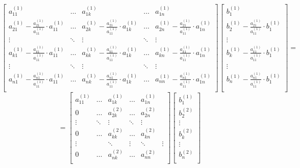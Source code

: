 \documentclass{article}
\begin{document}
\begin{center}
    $$
    \begin{bmatrix}
        a^{(1)}_{11} & \dots & a^{(1)}_{1k} & \dots & a^{(1)}_{1n} \\
        a^{(1)}_{21} -\frac{a^{(1)}_{21}}{a^{(1)}_{11}} \cdot a^{(1)}_{11} & \dots & a^{(1)}_{2k} -\frac{a^{(1)}_{21}}{a^{(1)}_{11}} \cdot a^{(1)}_{1k} & \dots & a^{(1)}_{2n} -\frac{a^{(1)}_{21}}{a^{(1)}_{11}} \cdot a^{(1)}_{1n} \\
        \vdots & \ddots &\vdots & \ddots & \vdots \\
        a^{(1)}_{k1} -\frac{a^{(1)}_{k1}}{a^{(1)}_{11}} \cdot a^{(1)}_{11} & \dots & a^{(1)}_{kk} -\frac{a^{(1)}_{k1}}{a^{(1)}_{11}} \cdot a^{(1)}_{1k} & \dots & a^{(1)}_{kn} -\frac{a^{(1)}_{k1}}{a^{(1)}_{11}} \cdot a^{(1)}_{1n} \\
        \vdots & \ddots & \vdots & \ddots & \vdots \\
        a^{(1)}_{n1} -\frac{a^{(1)}_{n1}}{a^{(1)}_{11}} \cdot a^{(1)}_{11} &  \dots & a^{(1)}_{nk} -\frac{a^{(1)}_{n1}}{a^{(1)}_{11}} \cdot a^{(1)}_{1k} & \dots & a^{(1)}_{nn} -\frac{a^{(1)}_{n1}}{a^{(1)}_{11}} \cdot a^{(1)}_{1n} \\
    \end{bmatrix}
    \begin{bmatrix}
        b^{(1)}_{1} \\
        b^{(1)}_{2} -\frac{a^{(1)}_{21}}{a^{(1)}_{11}} \cdot b^{(1)}_{1} \\
        \vdots \\
        b^{(1)}_{k} -\frac{a^{(1)}_{k1}}{a^{(1)}_{11}} \cdot b^{(1)}_{1} \\
        \vdots \\
        b^{(1)}_{n} -\frac{a^{(1)}_{n1}}{a^{(1)}_{11}} \cdot b^{(1)}_{1} \\
    \end{bmatrix}
    =
    $$
    $$
    =
    \begin{bmatrix}
        a^{(1)}_{11} & \dots & a^{(1)}_{1k} & \dots & a^{(1)}_{1n} \\
        0 & \dots & a^{(2)}_{2k} & \dots & a^{(2)}_{2n} \\
        \vdots & \ddots &\vdots & \ddots & \vdots \\
        0  & \dots & a^{(2)}_{kk} & \dots & a^{(2)}_{kn} \\
        \vdots &  & \ddots & \vdots & \ddots & \vdots \\
        0 & \dots & a^{(2)}_{nk} & \dots & a^{(2)}_{nn} \\
    \end{bmatrix}
    \begin{bmatrix}
        b^{(1)}_{1} \\
        b^{(2)}_{2} \\
        \vdots \\
        b^{(2)}_{k} \\
        \vdots \\
        b^{(2)}_{n} \\
    \end{bmatrix}
    $$
\end{center}
\end{document}
